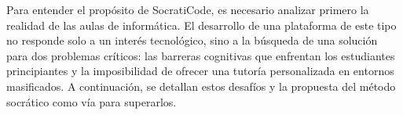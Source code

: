 Para entender el propósito de SocratiCode, es necesario analizar primero la realidad de las aulas de informática. El desarrollo de una plataforma de este tipo no responde solo a un interés tecnológico, sino a la búsqueda de una solución para dos problemas críticos: las barreras cognitivas que enfrentan los estudiantes principiantes y la imposibilidad de ofrecer una tutoría personalizada en entornos masificados. A continuación, se detallan estos desafíos y la propuesta del método socrático como vía para superarlos.